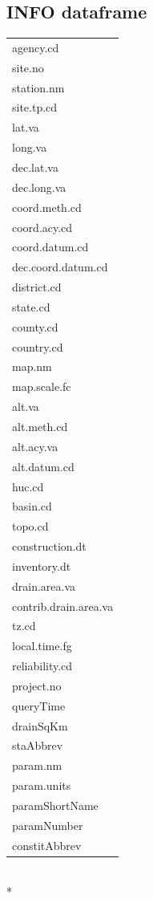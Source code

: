 \documentclass[a4paper,11pt]{article}
\begin{document}
\subsection{INFO dataframe}
\label{sec:appendix2INFO}
\begin{tabular}{l}
  \hline
  \hline
agency.cd \\ 
  site.no \\ 
  station.nm \\ 
  site.tp.cd \\ 
  lat.va \\ 
  long.va \\ 
  dec.lat.va \\ 
  dec.long.va \\ 
  coord.meth.cd \\ 
  coord.acy.cd \\ 
  coord.datum.cd \\ 
  dec.coord.datum.cd \\ 
  district.cd \\ 
  state.cd \\ 
  county.cd \\ 
  country.cd \\ 
  map.nm \\ 
  map.scale.fc \\ 
  alt.va \\ 
  alt.meth.cd \\ 
  alt.acy.va \\ 
  alt.datum.cd \\ 
  huc.cd \\ 
  basin.cd \\ 
  topo.cd \\ 
  construction.dt \\ 
  inventory.dt \\ 
  drain.area.va \\ 
  contrib.drain.area.va \\ 
  tz.cd \\ 
  local.time.fg \\ 
  reliability.cd \\ 
  project.no \\ 
  queryTime \\ 
  drainSqKm \\ 
  staAbbrev \\ 
  param.nm \\ 
  param.units \\ 
  paramShortName \\ 
  paramNumber \\ 
  constitAbbrev \\ 
   \hline
\end{tabular}
\\*
\end{document}
